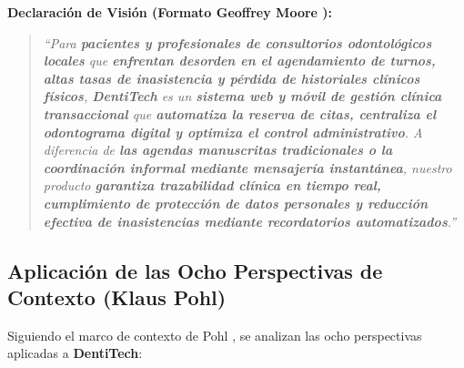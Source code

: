 \documentclass[11pt,a4paper]{article}
\begin{document}
\textbf{Declaración de Visión (Formato Geoffrey Moore \cite{moore2014}):}
\begin{quote}
\textit{``Para \textbf{pacientes y profesionales de consultorios odontológicos locales} que \textbf{enfrentan desorden en el agendamiento de turnos, altas tasas de inasistencia y pérdida de historiales clínicos físicos}, \textbf{DentiTech} es un \textbf{sistema web y móvil de gestión clínica transaccional} que \textbf{automatiza la reserva de citas, centraliza el odontograma digital y optimiza el control administrativo}. A diferencia de \textbf{las agendas manuscritas tradicionales o la coordinación informal mediante mensajería instantánea}, nuestro producto \textbf{garantiza trazabilidad clínica en tiempo real, cumplimiento de protección de datos personales y reducción efectiva de inasistencias mediante recordatorios automatizados}.''}
\end{quote}

\subsection{Aplicación de las Ocho Perspectivas de Contexto (Klaus Pohl)}

Siguiendo el marco de contexto de Pohl \cite{pohl2025}, se analizan las ocho perspectivas aplicadas a \textbf{DentiTech}:
\end{document}
